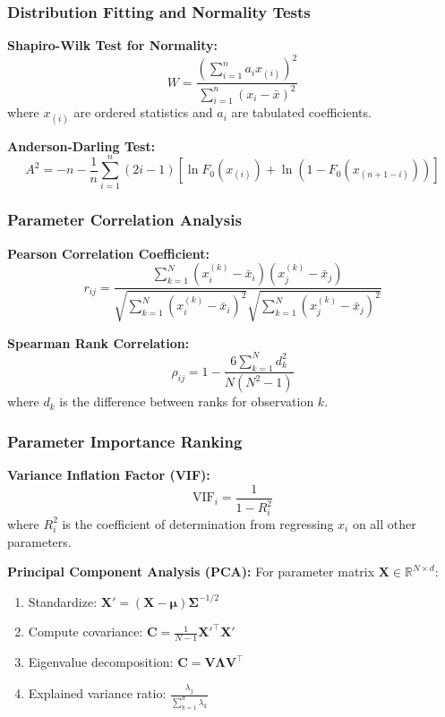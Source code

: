 \documentclass[12pt,a4paper]{article}
\begin{document}
\subsubsection{Distribution Fitting and Normality Tests}
\textbf{Shapiro-Wilk Test for Normality:}
\begin{equation}
W = \frac{\left(\sum_{i=1}^n a_i x_{(i)}\right)^2}{\sum_{i=1}^n (x_i - \bar{x})^2} \label{eq:shapiro_wilk}
\end{equation}
where $x_{(i)}$ are ordered statistics and $a_i$ are tabulated coefficients.

\textbf{Anderson-Darling Test:}
\begin{equation}
A^2 = -n - \frac{1}{n} \sum_{i=1}^n (2i-1) \left[\ln F_0(x_{(i)}) + \ln(1 - F_0(x_{(n+1-i)}))\right] \label{eq:anderson_darling}
\end{equation}

\subsubsection{Parameter Correlation Analysis}
\textbf{Pearson Correlation Coefficient:}
\begin{equation}
r_{ij} = \frac{\sum_{k=1}^N (x_i^{(k)} - \bar{x}_i)(x_j^{(k)} - \bar{x}_j)}{\sqrt{\sum_{k=1}^N (x_i^{(k)} - \bar{x}_i)^2} \sqrt{\sum_{k=1}^N (x_j^{(k)} - \bar{x}_j)^2}} \label{eq:pearson_correlation}
\end{equation}

\textbf{Spearman Rank Correlation:}
\begin{equation}
\rho_{ij} = 1 - \frac{6 \sum_{k=1}^N d_k^2}{N(N^2 - 1)} \label{eq:spearman_correlation}
\end{equation}
where $d_k$ is the difference between ranks for observation $k$.

\subsubsection{Parameter Importance Ranking}
\textbf{Variance Inflation Factor (VIF):}
\begin{equation}
\text{VIF}_i = \frac{1}{1 - R_i^2} \label{eq:vif}
\end{equation}
where $R_i^2$ is the coefficient of determination from regressing $x_i$ on all other parameters.

\textbf{Principal Component Analysis (PCA):}
For parameter matrix $\mathbf{X} \in \mathbb{R}^{N \times d}$:
\begin{enumerate}
\item Standardize: $\mathbf{X}' = (\mathbf{X} - \bm{\mu}) \mathbf{\Sigma}^{-1/2}$
\item Compute covariance: $\mathbf{C} = \frac{1}{N-1} \mathbf{X}'^\top \mathbf{X}'$
\item Eigenvalue decomposition: $\mathbf{C} = \mathbf{V} \mathbf{\Lambda} \mathbf{V}^\top$
\item Explained variance ratio: $\frac{\lambda_j}{\sum_{k=1}^d \lambda_k}$
\end{enumerate}
\end{document}

